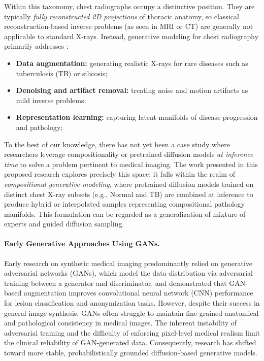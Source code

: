 Within this taxonomy, chest radiographs occupy a distinctive position. 
They are typically \emph{fully reconstructed 2D projections} of thoracic anatomy, 
so classical reconstruction-based inverse problems (as seen in MRI or CT) are generally not applicable to standard X-rays.
Instead, generative modeling for chest radiography primarily addresses \citep{generative_ai_medical_imaging_2025}:
\begin{itemize}
    \item \textbf{Data augmentation:} generating realistic X-rays for rare diseases such as tuberculosis (TB) or silicosis;
    \item \textbf{Denoising and artifact removal:} treating noise and motion artifacts as mild inverse problems;
    \item \textbf{Representation learning:} capturing latent manifolds of disease progression and pathology;
\end{itemize}

To the best of our knowledge, there has not yet been a case study where researchers leverage compositionality or pretrained diffusion models \emph{at inference time} to solve a problem pertinent to medical imaging. 
The work presented in this proposed research explores precisely this space: it falls within the realm of \emph{compositional generative modeling}, where pretrained diffusion models trained on distinct chest X-ray subsets (e.g., Normal and TB) are combined at inference to produce hybrid or interpolated samples representing compositional pathology manifolds. 
This formulation can be regarded as a generalization of mixture-of-experts and guided diffusion sampling.


\paragraph{Early Generative Approaches Using GANs.}
Early research on synthetic medical imaging predominantly relied on generative adversarial networks (GANs), which model the data distribution via adversarial training between a generator and discriminator. \citet{gan_medical_image_augmentation_2018} and \citet{medical_image_synthesis_gans_2018} demonstrated that GAN-based augmentation improves convolutional neural network (CNN) performance for lesion classification and anonymization tasks. However, despite their success in general image synthesis, GANs often struggle to maintain fine-grained anatomical and pathological consistency in medical images. The inherent instability of adversarial training and the difficulty of enforcing pixel-level medical realism limit the clinical reliability of GAN-generated data. Consequently, research has shifted toward more stable, probabilistically grounded diffusion-based generative models.

